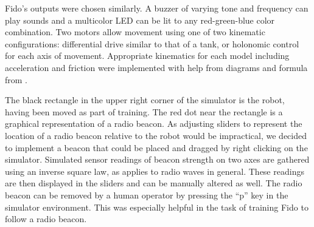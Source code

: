 Fido's outputs were chosen similarly.  A buzzer of varying tone and frequency can play sounds and a multicolor LED can be lit to any red-green-blue color combination. Two motors allow movement using one of two kinematic configurations: differential drive similar to that of a tank, or holonomic control for each axis of movement.  Appropriate kinematics for each model including acceleration and friction were implemented with help from diagrams and formula from \cite{dudek}.

The black rectangle in the upper right corner of the simulator is the robot, having been moved as part of training.  The red dot near the rectangle is a graphical representation of a radio beacon.  As adjusting sliders to represent the location of a radio beacon relative to the robot would be impractical, we decided to implement a beacon that could be placed and dragged by right clicking on the simulator.  Simulated sensor readings of beacon strength on two axes are gathered using an inverse square law, as applies to radio waves in general.  These readings are then displayed in the sliders and can be manually altered as well.  The radio beacon can be removed by a human operator by pressing the ``p'' key in the simulator environment.  This was especially helpful in the task of training Fido to follow a radio beacon.

